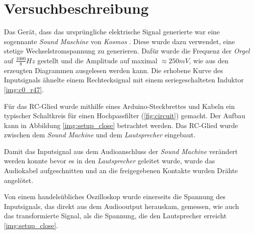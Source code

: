 \documentclass{article}
\begin{document}

\section{Versuchbeschreibung}
Das Gerät, dass das ursprüngliche elektrische Signal generierte war eine sogennante \emph{Sound Maschine} von \emph{Kosmos} \cite{sound_machine_experimentierkasten_kosmos}.
Diese wurde dazu verwendet, eine stetige Wechselstromspannung zu generieren. Dafür wurde die Frequenz der \emph{Orgel} auf $\frac{1000}{8}Hz$ gestellt und die Amplitude auf maximal $\approx 250mV$, wie aus den erzeugten Diagrammen ausgelesen werden kann. Die erhobene Kurve des Inputsignals ähnelte einem Rechtecksignal mit einem seriegeschalteten Induktor \ref{img:c0_r47}.

Für das RC-Glied wurde mithilfe eines Arduino-Steckbrettes und Kabeln ein typischer Schaltkreis für einen Hochpassfilter (\ref{fig:circuit}) gemacht. Der Aufbau kann in Abbildung \ref{img:setup_close} betrachtet werden. Das RC-Glied wurde zwischen dem \emph{Sound Machine} \cite{sound_machine_experimentierkasten_kosmos} und dem \emph{Lautsprecher} eingebaut.

Damit das Inputsignal aus dem Audioanschluss der \emph{Sound Machine} verändert werden konnte bevor es in den \emph{Lautsprecher} geleitet wurde, wurde das Audiokabel aufgeschnitten und an die freigegebenen Kontakte wurden Drähte angelötet.

Von einem handelsübliches Oszilloskop wurde einerseits die Spannung des Inputsignals, das direkt aus dem Audiooutput herauskam, gemessen, wie auch das transformierte Signal, als die Spannung, die den Lautsprecher erreicht \ref{img:setup_close}.
\end{document}
